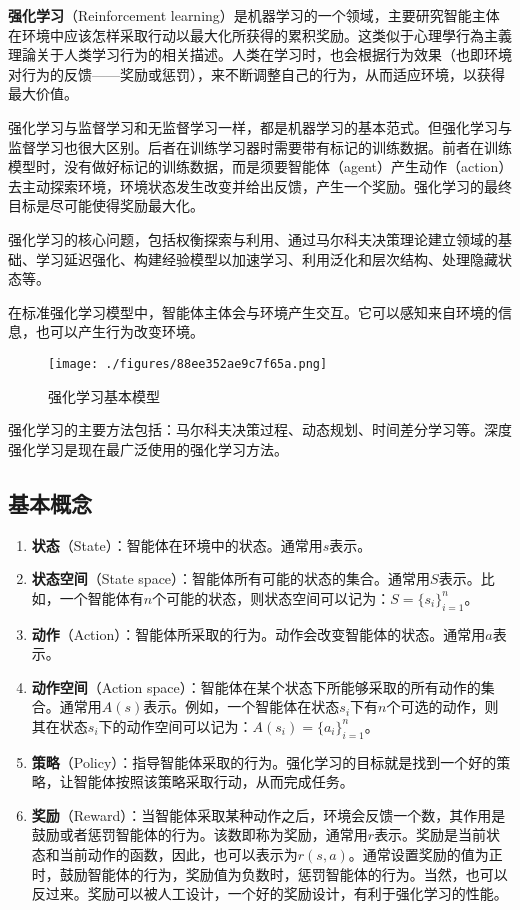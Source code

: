
\textbf{强化学习}（Reinforcement learning）是机器学习的一个领域，主要研究智能主体在环境中应该怎样采取行动以最大化所获得的累积奖励。这类似于心理學行為主義理論关于人类学习行为的相关描述。人类在学习时，也会根据行为效果（也即环境对行为的反馈——奖励或惩罚），来不断调整自己的行为，从而适应环境，以获得最大价值。

强化学习与监督学习和无监督学习一样，都是机器学习的基本范式。但强化学习与监督学习也很大区别。后者在训练学习器时需要带有标记的训练数据。前者在训练模型时，没有做好标记的训练数据，而是须要智能体（agent）产生动作（action）去主动探索环境，环境状态发生改变并给出反馈，产生一个奖励。强化学习的最终目标是尽可能使得奖励最大化。

强化学习的核心问题，包括权衡探索与利用、通过马尔科夫决策理论建立领域的基础、学习延迟强化、构建经验模型以加速学习、利用泛化和层次结构、处理隐藏状态等。

在标准强化学习模型中，智能体主体会与环境产生交互。它可以感知来自环境的信息，也可以产生行为改变环境。

\begin{figure}[ht]
\centering
\texttt{[image: ./figures/88ee352ae9c7f65a.png]}
\caption{强化学习基本模型} \label{fig_rl_1}
\end{figure}

强化学习的主要方法包括：马尔科夫决策过程、动态规划、时间差分学习等。深度强化学习是现在最广泛使用的强化学习方法。

\subsection{基本概念}

\begin{enumerate}
\item \textbf{状态}（State）：智能体在环境中的状态。通常用$s$表示。
\item \textbf{状态空间}（State space）：智能体所有可能的状态的集合。通常用$S$表示。比如，一个智能体有$n$个可能的状态，则状态空间可以记为：$S=\{s_i\}_{i=1}^{n}$。
\item \textbf{动作}（Action）：智能体所采取的行为。动作会改变智能体的状态。通常用$a$表示。
\item \textbf{动作空间}（Action space）：智能体在某个状态下所能够采取的所有动作的集合。通常用$A(s)$表示。例如，一个智能体在状态$s_i$下有$n$个可选的动作，则其在状态$s_i$下的动作空间可以记为：$A(s_i)=\{a_i\}_{i=1}^{n}$。
\item \textbf{策略}（Policy）：指导智能体采取的行为。强化学习的目标就是找到一个好的策略，让智能体按照该策略采取行动，从而完成任务。
\item \textbf{奖励}（Reward）：当智能体采取某种动作之后，环境会反馈一个数，其作用是鼓励或者惩罚智能体的行为。该数即称为奖励，通常用$r$表示。奖励是当前状态和当前动作的函数，因此，也可以表示为$r(s,a)$。通常设置奖励的值为正时，鼓励智能体的行为，奖励值为负数时，惩罚智能体的行为。当然，也可以反过来。奖励可以被人工设计，一个好的奖励设计，有利于强化学习的性能。
\end{enumerate}



